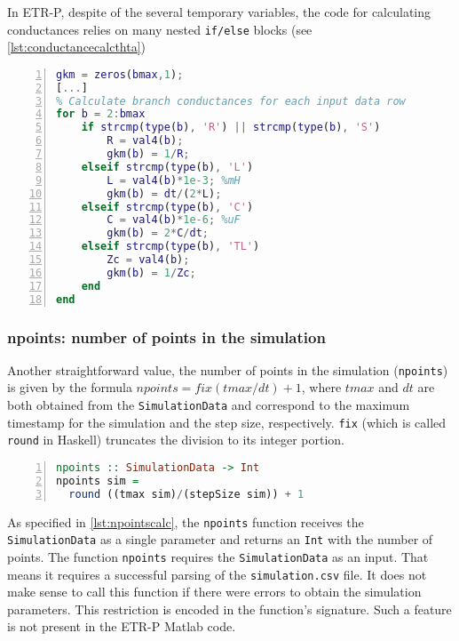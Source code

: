 In ETR-P, despite of the several temporary variables, the code for calculating conductances relies on many nested \lstinline!if/else! blocks (see \cref{lst:conductancecalcthta})

\begin{lstlisting}[language=Matlab, numbers=left, caption={Calculating conductances in Matlab}, captionpos=b, label={lst:conductancecalcthta}]
% gkm = conductance for each element in the input file
gkm = zeros(bmax,1);
[...]
% Calculate branch conductances for each input data row
for b = 2:bmax
    if strcmp(type(b), 'R') || strcmp(type(b), 'S')
        R = val4(b);
        gkm(b) = 1/R;
    elseif strcmp(type(b), 'L')
        L = val4(b)*1e-3; %mH
        gkm(b) = dt/(2*L);
    elseif strcmp(type(b), 'C')
        C = val4(b)*1e-6; %uF
        gkm(b) = 2*C/dt;
    elseif strcmp(type(b), 'TL')
        Zc = val4(b);
        gkm(b) = 1/Zc;
    end
end
\end{lstlisting}


\subsubsection {npoints: number of points in the simulation}

Another straightforward value, the number of points in the simulation (\lstinline!npoints!) is given by the formula $ npoints = fix(tmax/dt) + 1 $, where $ tmax $ and $ dt $ are both obtained from the \lstinline!SimulationData! and correspond to the maximum timestamp for the simulation and the step size, respectively. \lstinline!fix! (which is called \lstinline!round! in Haskell) truncates the division to its integer portion.

\begin{lstlisting}[language=Haskell, numbers=left, caption={Determining the number of points in the simulation npoints}, captionpos=b, label={lst:npointscalc}]
npoints :: SimulationData -> Int
npoints sim = 
  round ((tmax sim)/(stepSize sim)) + 1
\end{lstlisting}

As specified in \cref{lst:npointscalc}, the \lstinline!npoints! function receives the \lstinline!SimulationData! as a single parameter and returns an \lstinline!Int! with the number of points. The function \lstinline!npoints! requires the \lstinline!SimulationData! as an input. That means it requires a successful parsing of the \lstinline!simulation.csv! file. It does not make sense to call this function if there were errors to obtain the simulation parameters. This restriction is encoded in the function's signature. Such a feature is not present in the ETR-P Matlab code.

